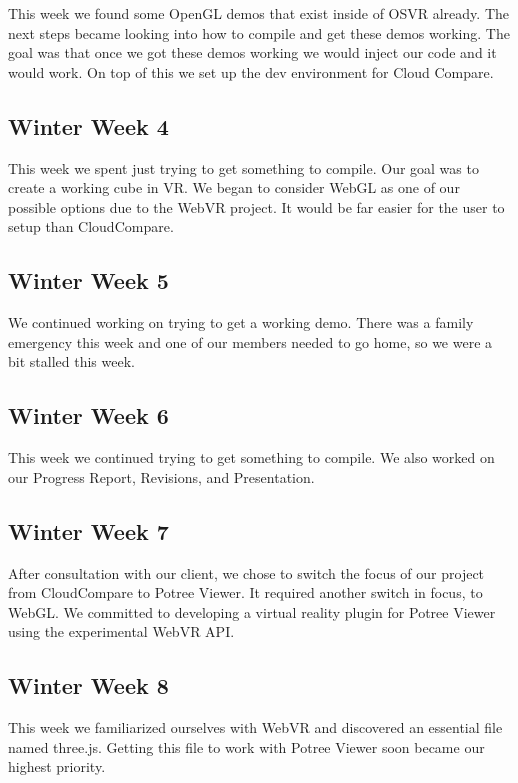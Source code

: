 \documentclass{article}
\begin{document}
This week we found some OpenGL demos that exist inside of OSVR already.
The next steps became looking into how to compile and get these demos working.
The goal was that once we got these demos working we would inject our code and it would work.
On top of this we set up the dev environment for Cloud Compare.

\subsection{Winter Week 4}

This week we spent just trying to get something to compile.
Our goal was to create a working cube in VR.
We began to consider WebGL as one of our possible options due to the WebVR project. 
It would be far easier for the user to setup than CloudCompare.

\subsection{Winter Week 5}

We continued working on trying to get a working demo.
There was a family emergency this week and one of our members needed to go home, so we were a bit stalled this week.

\subsection{Winter Week 6}

This week we continued trying to get something to compile.
We also worked on our Progress Report, Revisions, and Presentation.

\subsection{Winter Week 7}

After consultation with our client, we chose to switch the focus of our project from CloudCompare to Potree Viewer. 
It required another switch in focus, to WebGL. 
We committed to developing a virtual reality plugin for Potree Viewer using the experimental WebVR API.

\subsection{Winter Week 8}

This week we familiarized ourselves with WebVR and discovered an essential file named three.js. 
Getting this file to work with Potree Viewer soon became our highest priority.
\end{document}
